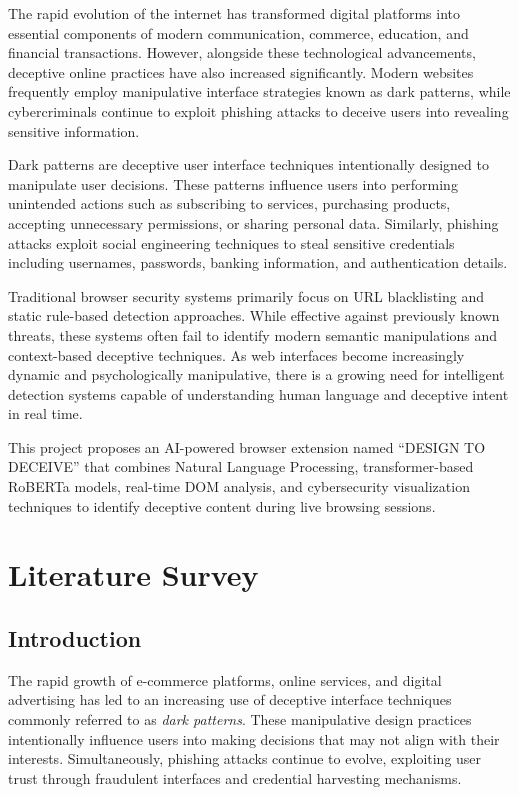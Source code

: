 \documentclass[12pt,a4paper]{report}
\begin{document}
The rapid evolution of the internet has transformed digital platforms into essential components of modern communication, commerce, education, and financial transactions. However, alongside these technological advancements, deceptive online practices have also increased significantly. Modern websites frequently employ manipulative interface strategies known as dark patterns, while cybercriminals continue to exploit phishing attacks to deceive users into revealing sensitive information.

Dark patterns are deceptive user interface techniques intentionally designed to manipulate user decisions. These patterns influence users into performing unintended actions such as subscribing to services, purchasing products, accepting unnecessary permissions, or sharing personal data. Similarly, phishing attacks exploit social engineering techniques to steal sensitive credentials including usernames, passwords, banking information, and authentication details.

Traditional browser security systems primarily focus on URL blacklisting and static rule-based detection approaches. While effective against previously known threats, these systems often fail to identify modern semantic manipulations and context-based deceptive techniques. As web interfaces become increasingly dynamic and psychologically manipulative, there is a growing need for intelligent detection systems capable of understanding human language and deceptive intent in real time.

This project proposes an AI-powered browser extension named ``DESIGN TO DECEIVE'' that combines Natural Language Processing, transformer-based RoBERTa models, real-time DOM analysis, and cybersecurity visualization techniques to identify deceptive content during live browsing sessions.

\chapter{Literature Survey}

\section{Introduction}
The rapid growth of e-commerce platforms, online services, and digital advertising has led to an increasing use of deceptive interface techniques commonly referred to as \textit{dark patterns}. These manipulative design practices intentionally influence users into making decisions that may not align with their interests. Simultaneously, phishing attacks continue to evolve, exploiting user trust through fraudulent interfaces and credential harvesting mechanisms.
\end{document}
